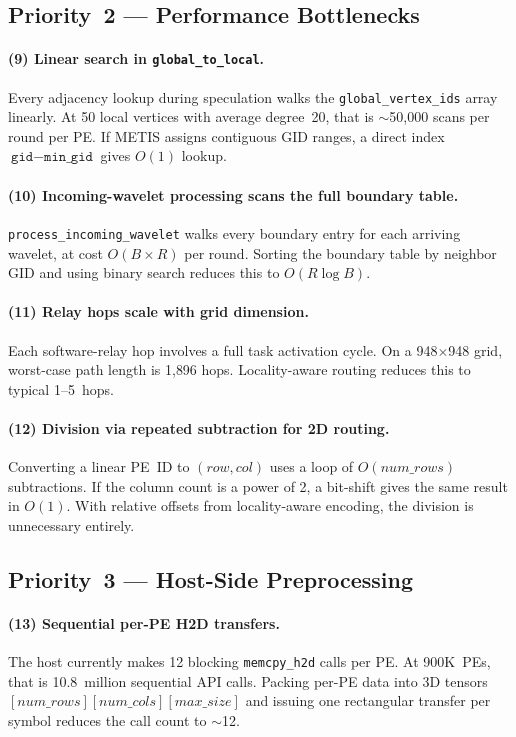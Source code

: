 \documentclass[11pt,letterpaper]{article}
\begin{document}
\subsection{Priority~2 --- Performance Bottlenecks}

\paragraph{(9) Linear search in \texttt{global\_to\_local}.}
Every adjacency lookup during speculation walks the \texttt{global\_vertex\_ids}
array linearly.
At 50 local vertices with average degree~20,
that is $\sim$50{,}000 scans per round per PE.
If METIS assigns contiguous GID ranges,
a direct index $\texttt{gid} - \texttt{min\_gid}$ gives $O(1)$ lookup.

\paragraph{(10) Incoming-wavelet processing scans the full boundary table.}
\texttt{process\_incoming\_wavelet} walks every boundary entry
for each arriving wavelet, at cost $O(B \times R)$ per round.
Sorting the boundary table by neighbor GID
and using binary search reduces this to $O(R \log B)$.

\paragraph{(11) Relay hops scale with grid dimension.}
Each software-relay hop involves a full task activation cycle.
On a 948$\times$948 grid, worst-case path length is 1{,}896 hops.
Locality-aware routing reduces this to typical 1--5~hops.

\paragraph{(12) Division via repeated subtraction for 2D routing.}
Converting a linear PE~ID to $(row, col)$ uses a loop
of $O(\mathit{num\_rows})$ subtractions.
If the column count is a power of 2,
a bit-shift gives the same result in $O(1)$.
With relative offsets from locality-aware encoding, the division is unnecessary entirely.

\subsection{Priority~3 --- Host-Side Preprocessing}

\paragraph{(13) Sequential per-PE H2D transfers.}
The host currently makes 12 blocking \texttt{memcpy\_h2d} calls per PE.
At 900K~PEs, that is 10.8~million sequential API calls.
Packing per-PE data into 3D tensors
$[\mathit{num\_rows}][\mathit{num\_cols}][\mathit{max\_size}]$
and issuing one rectangular transfer per symbol
reduces the call count to $\sim$12.
\end{document}
